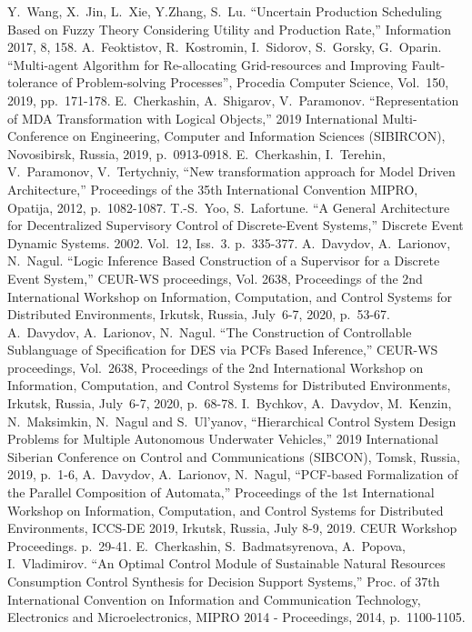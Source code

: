 \documentclass[conference]{IEEEtran}
\begin{document}
\begin{thebibliography}{999}
     Y.~Wang, X.~Jin, L.~Xie, Y.Zhang, S.~Lu. ``Uncertain Production Scheduling Based on Fuzzy Theory Considering Utility and Production Rate,'' Information 2017, 8, 158.
     A.~Feoktistov, R.~Kostromin, I.~Sidorov, S.~Gorsky, G.~Oparin. ``Multi-agent Algorithm for Re-allocating Grid-resources and Improving Fault-tolerance of Problem-solving Processes'', Procedia Computer Science, Vol.~150, 2019, pp.~171-178. 
     E.~Cherkashin, A.~Shigarov, V.~Paramonov. ``Representation of MDA Transformation with Logical Objects,'' 2019 International Multi-Conference on Engineering, Computer and Information Sciences (SIBIRCON), Novosibirsk, Russia, 2019, p.~0913-0918. 
     E.~Cherkashin, I.~Terehin, V.~Paramonov, V.~Tertychniy, ``New transformation approach for Model Driven Architecture,'' Proceedings of the 35th International Convention MIPRO, Opatija, 2012, p.~1082-1087.
     T.-S.~Yoo, S.~Lafortune. ``A General Architecture for Decentralized Supervisory Control of Discrete-Event Systems,'' Discrete Event Dynamic Systems. 2002. Vol.~12, Iss.~3. p.~335-377. 
     A.~Davydov, A.~Larionov, N.~Nagul. ``Logic Inference Based Construction of a Supervisor for a Discrete Event System,'' CEUR-WS proceedings, Vol. 2638, Proceedings of the 2nd International Workshop on Information, Computation, and Control Systems for Distributed Environments, Irkutsk, Russia, July~6-7, 2020,  p.~53-67.
     A.~Davydov, A.~Larionov, N.~Nagul. ``The Construction of Controllable Sublanguage of Specification for DES via PCFs Based Inference,'' CEUR-WS proceedings, Vol.~2638, Proceedings of the 2nd International Workshop on Information, Computation, and Control Systems for Distributed Environments, Irkutsk, Russia, July~6-7, 2020, p.~68-78.
     I.~Bychkov, A.~Davydov, M.~Kenzin, N.~Maksimkin, N.~Nagul and S.~Ul’yanov, ``Hierarchical Control System Design Problems for Multiple Autonomous Underwater Vehicles,'' 2019 International Siberian Conference on Control and Communications (SIBCON), Tomsk, Russia, 2019, p.~1-6, 
     A.~Davydov, A.~Larionov, N.~Nagul, ``PCF-based Formalization of the Parallel Composition of Automata,'' Proceedings of the 1st International Workshop on Information, Computation, and Control Systems for Distributed Environments, ICCS-DE 2019, Irkutsk, Russia, July 8-9, 2019. CEUR Workshop Proceedings. p.~29-41.
     E.~Cherkashin, S.~Badmatsyrenova, A.~Popova, I.~Vladimirov. ``An Optimal Control Module of Sustainable Natural Resources Consumption Control Synthesis for Decision Support Systems,'' Proc. of 37th International Convention on Information and Communication Technology, Electronics and Microelectronics, MIPRO 2014 - Proceedings, 2014, p.~1100-1105.

\end{thebibliography}
\end{document}
